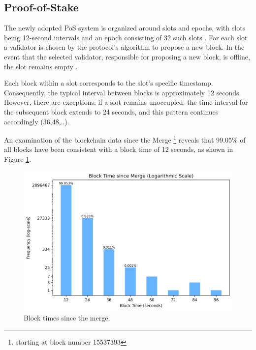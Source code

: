 \subsection{Proof-of-Stake}
\label{pos_block_time}

The newly adopted PoS system is organized around slots and epochs, with slots
being 12-second
intervals and an epoch consisting of 32 such slots
\cite{seconds-per-slot-mainnet}\cite{seconds-per-slot-mainnet-doc}. For each
slot a validator is chosen by the protocol's algorithm to propose a new block.
In the event that the selected validator, responsible for proposing a new
block, is offline, the slot remains empty
\cite{validator-offline}.

Each block within a slot corresponds to the slot's specific timestamp.
Consequently, the typical interval between blocks is approximately 12 seconds.
However, there are exceptions: if a slot remains unoccupied, the time interval
for the subsequent block extends to 24 seconds, and this pattern continues
accordingly (36,48,..).

An examination of the blockchain data since the Merge \footnote{starting at block number
15537393} reveals that 99.05\% of all blocks have been consistent with a block
time of 12 seconds, as shown in Figure
\ref{fig:block_time_analysis}.

\begin{figure}[H]
  \centering
  \includegraphics[width=1\textwidth]{block_time_analysis/pos_block_time_bar_chart_with_percentages.png}
  \caption{Block times since the merge.}
  \label{fig:block_time_analysis}
\end{figure}

